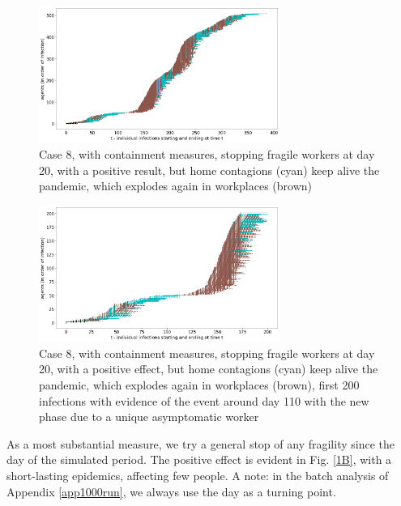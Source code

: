 \documentclass[graybox]{svmult}
\begin{document}
\begin{figure}[t]
\begin{center}
\includegraphics[width=0.7\textwidth]{withShort1A.png}%
\caption{Case 8, with containment measures, stopping fragile workers at day 20, with a positive result, but home contagions (cyan) keep alive the pandemic, which explodes again in workplaces (brown)}
\label{1A}
\end{center}
\end{figure}

\begin{figure}[t]
\begin{center}
\includegraphics[width=0.7\textwidth]{withShort1A200.png}%
\caption{Case 8, with containment measures, stopping fragile workers at day 20, with a positive effect, but home contagions (cyan) keep alive the pandemic, which explodes again in workplaces (brown), first 200 infections with evidence of the event around day 110 with the new phase due to a unique asymptomatic worker}
\label{1A200}
\end{center}
\end{figure}

As a most substantial measure, we try a general stop of any fragility since the  day of the simulated period. The positive effect is evident in Fig. \ref{1B}, with a short-lasting epidemics, affecting few people. A note: in the batch analysis of Appendix \ref{app1000run}, we always use the  day as a turning point.
\end{document}
